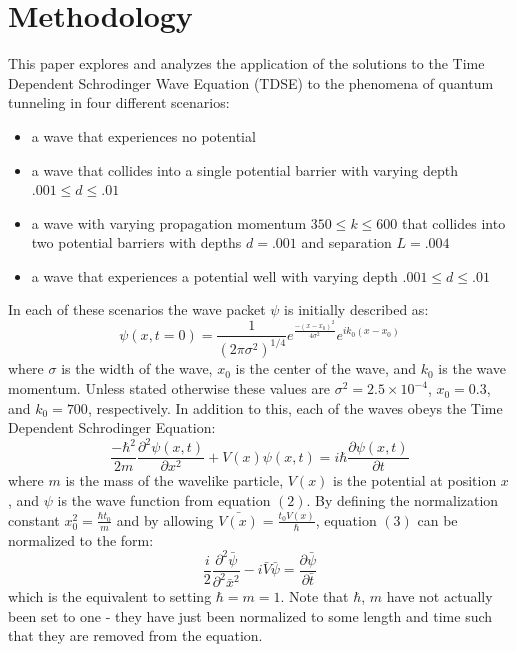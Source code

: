 \documentclass[twocolumn]{article}
\begin{document}
\section{Methodology}
\hspace{\parindent}This paper explores and analyzes the application of the solutions to the Time Dependent Schrodinger Wave Equation (TDSE) to the phenomena of quantum tunneling in four different scenarios:
\begin{itemize}
	\item a wave that experiences no potential
	\item a wave that collides into a single potential barrier with varying depth $.	001\leq d\leq.01$
	\item a wave with varying propagation momentum $350\leq k\leq600$ that collides into two potential barriers with depths $d=.001$ and separation $L=.004$
	\item a wave that experiences a potential well with varying depth $.001\leq d\leq.01$
\end{itemize}
In each of these scenarios the wave packet $\psi$ is initially described as:
\begin{equation}
	\psi(x,t=0)=\frac{1}{\left(2\pi\sigma^2\right)^{1/4}}e^{\frac{-(x-x_0)^{2}}{4\sigma^2}}e^{ik_0(x-x_0)}
\end{equation}
where $\sigma$ is the width of the wave, $x_0$ is the center of the wave, and $k_0$ is the wave momentum. Unless stated otherwise these values are $\sigma^2=2.5\times10^{-4}$, $x_0=0.3$, and $k_0=700$, respectively. In addition to this, each of the waves obeys the Time Dependent Schrodinger Equation:
\begin{equation}
	\frac{-\hbar^2}{2m}\frac{\partial^2\psi(x,t)}{\partial x^2}+V(x)\psi(x,t)=i\hbar\frac{\partial\psi(x,t)}{\partial t}
\end{equation}
where $m$ is the mass of the wavelike particle, $V(x)$ is the potential at position $x$, and $\psi$ is the wave function from equation $(2)$. By defining the normalization constant $x_0^2=\frac{\hbar t_0}{m}$ and by allowing $\bar{V(x)}=\frac{t_0 V(x)}{\hbar}$, equation $(3)$ can be normalized to the form:
\begin{equation}
	\frac{i}{2}\frac{\partial^2\bar{\psi}}{\partial^2 \bar{x}^2} - i\bar{V}\bar{\psi} = \frac{\partial \bar{\psi}}{\partial \bar{t}}
\end{equation}
which is the equivalent to setting $\hbar=m=1$. Note that $\hbar$, $m$ have not actually been set to one - they have just been normalized to some length
and time such that they are removed from the equation.
\end{document}
